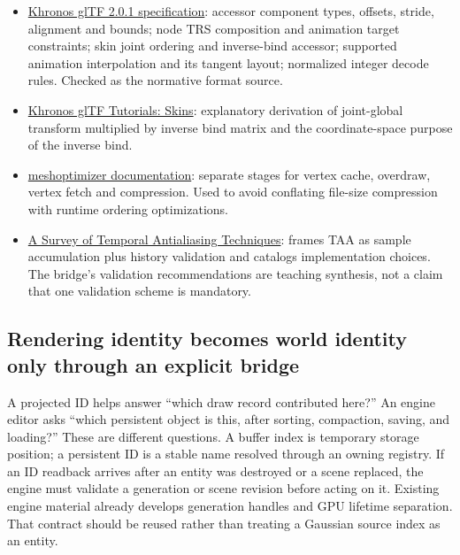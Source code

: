 \hypertarget{06-engine-ii-ch042-primary-references-used-for-corrections-and-terminology}{}

\begin{itemize}
\tightlist
\item
  \href{https://registry.khronos.org/glTF/specs/2.0/glTF-2.0.html}{Khronos glTF 2.0.1 specification}: accessor component types, offsets, stride, alignment and bounds; node TRS composition and animation target constraints; skin joint ordering and inverse-bind accessor; supported animation interpolation and its tangent layout; normalized integer decode rules. Checked as the normative format source.
\item
  \href{https://github.com/KhronosGroup/glTF-Tutorials/blob/main/gltfTutorial/gltfTutorial_020_Skins.md}{Khronos glTF Tutorials: Skins}: explanatory derivation of joint-global transform multiplied by inverse bind matrix and the coordinate-space purpose of the inverse bind.
\item
  \href{https://meshoptimizer.org/}{meshoptimizer documentation}: separate stages for vertex cache, overdraw, vertex fetch and compression. Used to avoid conflating file-size compression with runtime ordering optimizations.
\item
  \href{https://diglib.eg.org/items/cfa6a05c-53b3-4ee1-979d-48abc6225f6b}{A Survey of Temporal Antialiasing Techniques}: frames TAA as sample accumulation plus history validation and catalogs implementation choices. The bridge's validation recommendations are teaching synthesis, not a claim that one validation scheme is mandatory.
\end{itemize}

\subsection{Rendering identity becomes world identity only through an explicit bridge}\label{06-engine-ii-ch042-rendering-identity-becomes-world-identity-only-through-an-explicit-bridge}

\hypertarget{06-engine-ii-ch042-rendering-identity-becomes-world-identity-only-through-an-explicit-bridge}{}

A projected ID helps answer ``which draw record contributed here?'' An engine editor asks ``which persistent object is this, after sorting, compaction, saving, and loading?'' These are different questions. A buffer index is temporary storage position; a persistent ID is a stable name resolved through an owning registry. If an ID readback arrives after an entity was destroyed or a scene replaced, the engine must validate a generation or scene revision before acting on it. Existing engine material already develops generation handles and GPU lifetime separation. That contract should be reused rather than treating a Gaussian source index as an entity.

